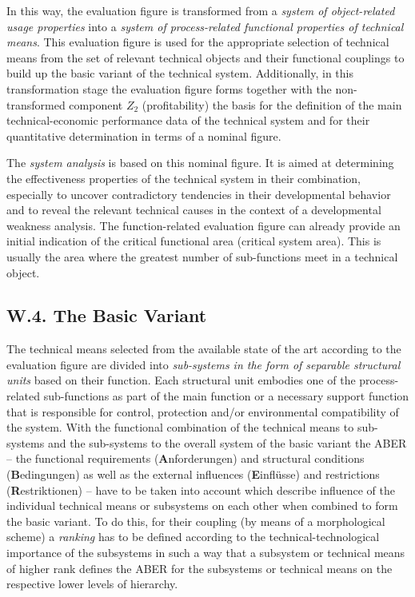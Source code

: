 \documentclass[11pt,a4paper]{article}
\begin{document}
In this way, the evaluation figure is transformed from a \emph{system of
  object-related usage properties} into a \emph{system of process-related
  functional properties of technical means}. This evaluation figure is used
for the appropriate selection of technical means from the set of relevant
technical objects and their functional couplings to build up the basic variant
of the technical system. Additionally, in this transformation stage the
evaluation figure forms together with the non-transformed component $Z_2$
(profitability) the basis for the definition of the main technical-economic
performance data of the technical system and for their quantitative
determination in terms of a nominal figure.

The \emph{system analysis} is based on this nominal figure. It is aimed at
determining the effectiveness properties of the technical system in their
combination, especially to uncover contradictory tendencies in their
developmental behavior and to reveal the relevant technical causes in the
context of a developmental weakness analysis. The function-related evaluation
figure can already provide an initial indication of the critical functional
area (critical system area). This is usually the area where the greatest
number of sub-functions meet in a technical object.

\subsection*{W.4. The Basic Variant}

The technical means selected from the available state of the art according to
the evaluation figure are divided into \emph{sub-systems in the form of
  separable structural units} based on their function.  Each structural unit
embodies one of the process-related sub-functions as part of the main function
or a necessary support function that is responsible for control, protection
and/or environmental compatibility of the system. With the functional
combination of the technical means to sub-systems and the sub-systems to the
overall system of the basic variant the ABER -- the functional requirements
(\textbf{A}nforderungen) and structural conditions (\textbf{B}edingungen) as
well as the external influences (\textbf{E}infl\"usse) and restrictions
(\textbf{R}estriktionen) -- have to be taken into account which describe
influence of the individual technical means or subsystems on each other when
combined to form the basic variant. To do this, for their coupling (by means
of a morphological scheme) a \emph{ranking} has to be defined according to the
technical-technological importance of the subsystems in such a way that a
subsystem or technical means of higher rank defines the ABER for the
subsystems or technical means on the respective lower levels of hierarchy.
\end{document}
